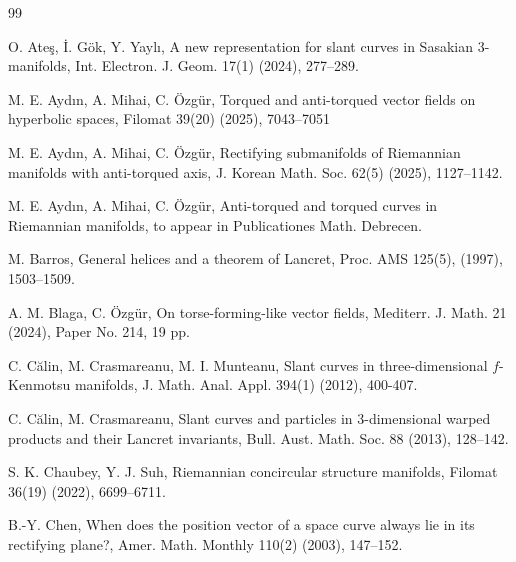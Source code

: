 \documentclass[12pt]{amsart}
\theoremstyle{definition}
\begin{document}
\begin{thebibliography}{99}


 O. Ateş, İ. Gök, Y. Yaylı, A new representation for slant curves in Sasakian $3$-manifolds, Int. Electron. J. Geom. 17(1) (2024), 277–289.

 M. E. Aydın, A. Mihai, C. Özgür, Torqued and anti-torqued vector fields on hyperbolic spaces, Filomat 39(20) (2025), 7043–7051

 M. E. Aydın, A. Mihai, C. Özgür, Rectifying submanifolds of Riemannian manifolds with anti-torqued axis, J. Korean Math. Soc. 62(5) (2025), 1127–1142.

 M. E. Aydın, A. Mihai, C. Özgür, Anti-torqued and torqued curves in Riemannian manifolds, to appear in Publicationes Math. Debrecen.

 M. Barros, General helices and a theorem of Lancret, Proc. AMS 125(5), (1997), 1503–1509.

 A. M. Blaga, C. Özgür, On torse-forming-like vector fields, Mediterr. J. Math. 21 (2024), Paper No. 214, 19 pp.

 C. C\u{a}lin, M. Crasmareanu, M. I. Munteanu, Slant curves in three-dimensional $f$-Kenmotsu manifolds, J. Math. Anal. Appl. 394(1) (2012), 400-407.

 C. C\u{a}lin, M. Crasmareanu, Slant curves and particles in 3-dimensional warped products and their Lancret invariants, Bull. Aust. Math. Soc. 88 (2013), 128–142.




 S. K. Chaubey, Y. J. Suh, Riemannian concircular structure manifolds, Filomat 36(19) (2022), 6699--6711.

 B.-Y. Chen, When does the position vector of a space curve always lie in its rectifying plane?, Amer. Math. Monthly 110(2) (2003), 147--152.



\end{thebibliography}
\end{document}
